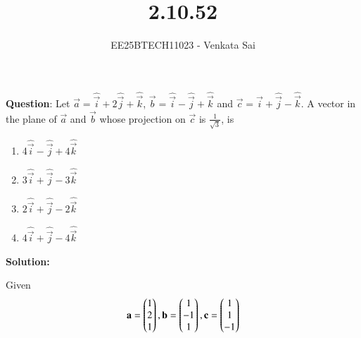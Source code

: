 \documentclass[journal]{IEEEtran}
\begin{document}


\title{2.10.52}
\author{EE25BTECH11023 - Venkata Sai}
{\let\newpage\relax\maketitle}

\renewcommand{\thefigure}{\theenumi}
\renewcommand{\thetable}{\theenumi}
\setlength{\intextsep}{10pt} %


\renewcommand{\thetable}{\theenumi}


\textbf{Question}:\newline
Let $\vec{a} = \hat{\vec{i}} + 2\hat{\vec{j}} + \hat{\vec{k}}$, $\vec{b} = \hat{\vec{i}} - \hat{\vec{j}} + \hat{\vec{k}}$ and $\vec{c} = \hat{\vec{i}} + \hat{\vec{j}} - \hat{\vec{k}}$. A vector in the plane of $\vec{a}$ and $\vec{b}$ whose projection on $\vec{c}$ is $\frac{1}{\sqrt{3}}$, is
\begin{multicols}{4}
\begin{enumerate}
\item 4$\hat{\vec{i}} - \hat{\vec{j}} + 4\hat{\vec{k}}$
\item 3$\hat{\vec{i}} + \hat{\vec{j}} - 3\hat{\vec{k}}$
\item $2\hat{\vec{i}} + \hat{\vec{j}} - 2\hat{\vec{k}}$
\item $4\hat{\vec{i}} + \hat{\vec{j}} - 4\hat{\vec{k}}$
\end{enumerate}
\end{multicols}

\textbf{Solution: }

Given
\begin{align}
\mathbf{a}=\begin{pmatrix}1\\2\\1\end{pmatrix},\mathbf{b}=\begin{pmatrix}1\\-1\\1\end{pmatrix},\mathbf{c}=\begin{pmatrix}1\\1\\-1\end{pmatrix}
\end{align}
\end{document}
